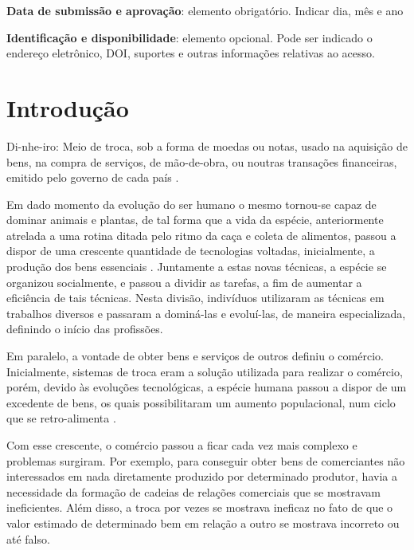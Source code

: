 \documentclass[
	article,			%
	11pt,				%
	oneside,			%
	a4paper,			%
	chapter=TITLE,		%
	section=TITLE,		%
	subsection=TITLE,	%
	subsubsection=TITLE, %
	english,			%
	brazil,				%
	sumario=tradicional
	]{ifrs-artigo-abntex2}
\begin{document}
\begin{center}\smaller
\textbf{Data de submissão e aprovação}: elemento obrigatório. Indicar dia, mês e ano

\textbf{Identificação e disponibilidade}: elemento opcional. Pode ser indicado 
o endereço eletrônico, DOI, suportes e outras informações relativas ao acesso.
\end{center}

\textual

\section{Introdução}
\begin{citacao}
Di-nhe-iro: Meio de troca, sob a forma de moedas ou notas, usado na aquisição de bens, na compra de serviços, de mão-de-obra, ou noutras transações financeiras, emitido pelo governo de cada país \cite{pribeream2013}.
\end{citacao}
Em dado momento da evolução do ser humano o mesmo tornou-se capaz de dominar animais e plantas, de tal forma que a vida da espécie, anteriormente atrelada a uma rotina ditada pelo ritmo da caça e coleta de alimentos, passou a dispor de uma crescente quantidade de tecnologias voltadas, inicialmente, a produção dos bens essenciais \cite{costa2009}. Juntamente a estas novas técnicas, a espécie se organizou socialmente, e passou a dividir as tarefas, a fim de aumentar a eficiência de tais técnicas. Nesta divisão, indivíduos utilizaram as técnicas em trabalhos diversos e passaram a dominá-las e evoluí-las, de maneira especializada, definindo o início das profissões. 

Em paralelo, a vontade de obter bens e serviços de outros definiu o comércio. Inicialmente, sistemas de troca eram a solução utilizada para realizar o comércio, porém, devido às evoluções tecnológicas, a espécie humana passou a dispor de um excedente de bens, os quais possibilitaram um aumento populacional, num ciclo que se retro-alimenta \cite{nogueira2018}.

Com esse crescente, o comércio passou a ficar cada vez mais complexo e problemas surgiram. Por exemplo, para conseguir obter bens de comerciantes não interessados em nada diretamente produzido por determinado produtor, havia a necessidade da formação de cadeias de relações comerciais que se mostravam ineficientes. Além disso, a troca por vezes se mostrava ineficaz no fato de que o valor estimado de determinado bem em relação a outro se mostrava incorreto ou até falso.
\end{document}
